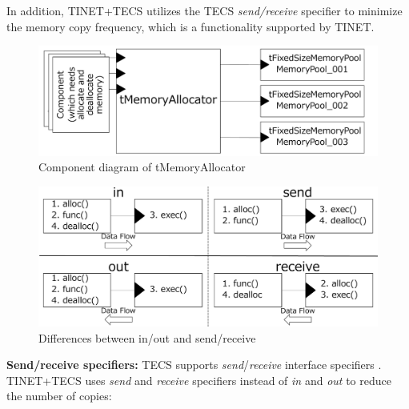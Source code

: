 \documentclass[a4j,12pt,oneside,openany,english]{jsbook}
\begin{document}
In addition, TINET+TECS utilizes the TECS {\it send/receive} specifier to minimize the memory copy frequency, which is a functionality supported by TINET.

\begin{figure}[t]
    \centering
    \includegraphics[width=12cm,clip]{figure/tMemoryAllocator.pdf}
    \caption{Component diagram of tMemoryAllocator}
    \label{fig:tMemoryAllocator}
\end{figure}

\begin{figure}[t]
    \centering
    \includegraphics[width=12cm,clip]{figure/SendReceive.pdf}
    \caption{Differences between in/out and send/receive}
    \label{fig:SendReceive}
\end{figure}

{\bf Send/receive specifiers:}
TECS supports {\it send}/{\it receive} interface specifiers \cite{par:RPC}.
TINET+TECS uses {\it send} and {\it receive} specifiers instead of {\it in} and {\it out} to reduce the number of copies:
\end{document}
